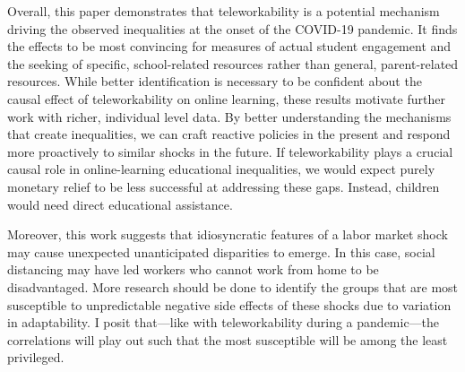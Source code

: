 Overall, this paper demonstrates that teleworkability is a potential mechanism driving the observed inequalities at the onset of the COVID-19 pandemic.
It finds the effects to be most convincing for measures of actual student engagement and the seeking of specific, school-related resources rather than general, parent-related resources.
While better identification is necessary to be confident about the causal effect of teleworkability on online learning, these results motivate further work with richer, individual level data.
By better understanding the mechanisms that create inequalities, we can craft reactive policies in the present and respond more proactively to similar shocks in the future.
If teleworkability plays a crucial causal role in online-learning educational inequalities, we would expect purely monetary relief to be less successful at addressing these gaps.
Instead, children would need direct educational assistance.

Moreover, this work suggests that idiosyncratic features of a labor market shock may cause unexpected unanticipated disparities to emerge.
In this case, social distancing may have led workers who cannot work from home to be disadvantaged.
More research should be done to identify the groups that are most susceptible to unpredictable negative side effects of these shocks due to variation in adaptability.
I posit that---like with teleworkability during a pandemic---the correlations will play out such that the most susceptible will be among the least privileged.

